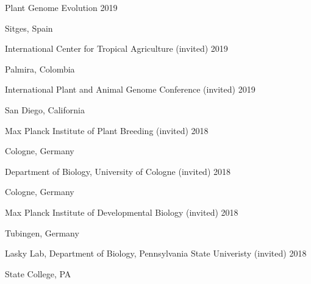 \documentclass[12pt,english]{article}
\begin{document}
\hspace*{1.0em}Plant Genome Evolution \hfill 2019 \par
\hspace*{2.0em}Sitges, Spain \par\vspace{0.5ex}

\hspace*{1.0em}International Center for Tropical Agriculture (invited) \hfill 2019 \par
\hspace*{2.0em}Palmira, Colombia \par\vspace{0.5ex}

\hspace*{1.0em}International Plant and Animal Genome Conference (invited) \hfill 2019 \par
\hspace*{2.0em}San Diego, California \par\vspace{0.5ex}

\hspace*{1.0em}Max Planck Institute of Plant Breeding (invited) \hfill 2018 \par
\hspace*{2.0em}Cologne, Germany \par\vspace{0.5ex}

\hspace*{1.0em}Department of Biology, University of Cologne (invited) \hfill 2018 \par
\hspace*{2.0em}Cologne, Germany \par\vspace{0.5ex}

\hspace*{1.0em}Max Planck Institute of Developmental Biology (invited) \hfill 2018 \par
\hspace*{2.0em}Tubingen, Germany  \par\vspace{0.5ex}

\hspace*{1.0em}Lasky Lab, Department of Biology, Pennsylvania State Univeristy (invited) \hfill 2018 \par
\hspace*{2.0em}State College, PA \par\vspace{0.5ex}
\end{document}
